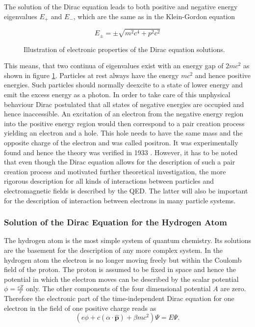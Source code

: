 The solution of the Dirac equation leads to both positive and negative energy
eigenvalues $E_+$ and $E_-$, which are the same as in the Klein-Gordon equation

\begin{equation}
E_\pm = \pm \sqrt{m^2c^4+p^2c^2}
\end{equation}

\begin{figure}
 \centering
 
 \caption{Illustration of electronic properties of the Dirac equation solutions.}
 \label{figure:dirac_solutions}
\end{figure}

This means, that two continua of eigenvalues exist with an energy gap of $2mc^2$
as shown in figure \ref{figure:dirac_solutions}.
Particles at rest always have the energy $mc^2$ and hence positive energies.
Such particles should normally deexcite to a state of lower energy and emit
the excess energy as a photon. In order to take care of this unphysical behaviour
Dirac postulated that all states of negative energies are occupied and hence
inaccessible. An excitation of an electron from the negative energy region into
the positive energy region would then correspond to a pair creation process yielding
an electron and a hole. This hole needs to have the same mass and the opposite charge
of the electron and was called positron. It was experimentally found and hence the
theory was verified in 1933
\cite{Anderson33}. However, it has to be noted that even though the Dirac equation
allows for the description of such a pair creation process and motivated further
theoretical investigation, the more rigorous
description for all kinds of interactions between particles and electromagnetic
fields is described by the \ac{QED}. The latter will also be important for the
description of interaction between electrons in many particle systems.



\subsubsection{Solution of the Dirac Equation for the Hydrogen Atom}\label{hatom}
The hydrogen atom is the most simple system of quantum chemistry. Its solutions
are the basement for the description of any more complex system.
In the hydrogen atom the electron is no longer moving freely but within the Coulomb
field of the proton. The proton is assumed to be fixed in space and hence the
potential in which the electron moves can be described by the scalar potential
$\phi=\frac{eZ}r$ only. The other components of the four dimensional potential $A$
are zero. Therefore the electronic part of the time-independent Dirac equation
for one electron in the field of one positive charge reads as
\begin{equation}
\left(e\phi + c(\alpha\cdot\hat{\mathbf{p}})+\beta mc^2\right) \Psi = E \Psi.
\end{equation}

